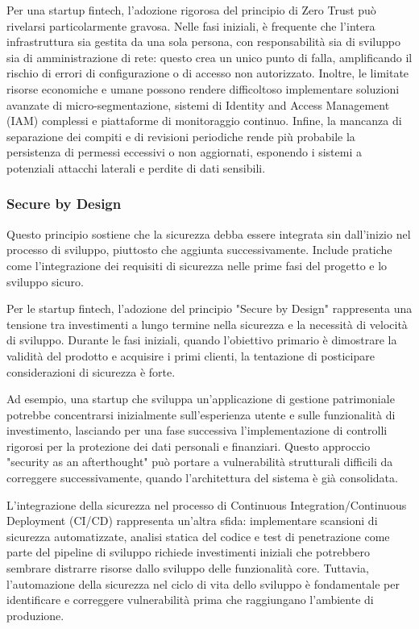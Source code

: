 \documentclass[a4paper,12pt]{report}
\begin{document}
Per una startup fintech, l'adozione rigorosa del principio di Zero Trust può rivelarsi particolarmente gravosa. Nelle fasi iniziali, è frequente che l'intera infrastruttura sia gestita da una sola persona, con responsabilità sia di sviluppo sia di amministrazione di rete: questo crea un unico punto di falla, amplificando il rischio di errori di configurazione o di accesso non autorizzato. Inoltre, le limitate risorse economiche e umane possono rendere difficoltoso implementare soluzioni avanzate di micro-segmentazione, sistemi di Identity and Access Management (IAM) complessi e piattaforme di monitoraggio continuo. Infine, la mancanza di separazione dei compiti e di revisioni periodiche rende più probabile la persistenza di permessi eccessivi o non aggiornati, esponendo i sistemi a potenziali attacchi laterali e perdite di dati sensibili.  


\subsubsection{Secure by Design}
Questo principio sostiene che la sicurezza debba essere integrata sin dall'inizio nel processo di sviluppo, piuttosto che aggiunta successivamente. Include pratiche come l'integrazione dei requisiti di sicurezza nelle prime fasi del progetto e lo sviluppo sicuro.

Per le startup fintech, l'adozione del principio "Secure by Design" rappresenta una tensione tra investimenti a lungo termine nella sicurezza e la necessità di velocità di sviluppo. Durante le fasi iniziali, quando l'obiettivo primario è dimostrare la validità del prodotto e acquisire i primi clienti, la tentazione di posticipare considerazioni di sicurezza è forte.

Ad esempio, una startup che sviluppa un'applicazione di gestione patrimoniale potrebbe concentrarsi inizialmente sull'esperienza utente e sulle funzionalità di investimento, lasciando per una fase successiva l'implementazione di controlli rigorosi per la protezione dei dati personali e finanziari. Questo approccio "security as an afterthought" può portare a vulnerabilità strutturali difficili da correggere successivamente, quando l'architettura del sistema è già consolidata.

L'integrazione della sicurezza nel processo di Continuous Integration/Continuous Deployment (CI/CD) rappresenta un'altra sfida: implementare scansioni di sicurezza automatizzate, analisi statica del codice e test di penetrazione come parte del pipeline di sviluppo richiede investimenti iniziali che potrebbero sembrare distrarre risorse dallo sviluppo delle funzionalità core. Tuttavia, l'automazione della sicurezza nel ciclo di vita dello sviluppo è fondamentale per identificare e correggere vulnerabilità prima che raggiungano l'ambiente di produzione.
\end{document}
